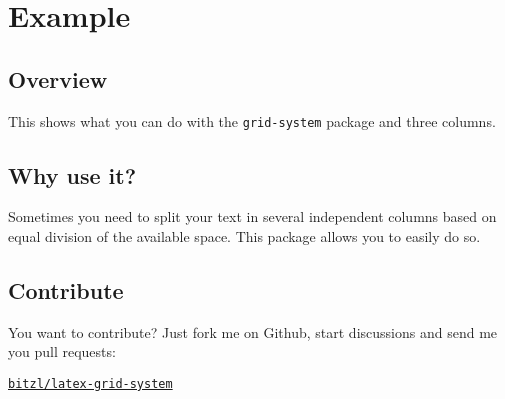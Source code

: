\documentclass[DIV13]{scrartcl}
\begin{document}
\section{Example}
\begin{row}[cellsep=0.75cm]{3}{3}
	\begin{cell}{1}
	\section*{Overview}
	\vspace{-1.5ex}
	This shows what you can do with the \texttt{grid-system} package and three columns.
	\end{cell}
	\begin{cell}{1}
	\section*{Why use it?}
	\vspace{-1.5ex}
	Sometimes you need to split your text in several independent columns based on equal division of the available space. This package allows you to easily do so.
	\end{cell}
	\begin{cell}{1}
	\section*{Contribute}
	\vspace{-1.5ex}
	You want to contribute? Just fork me on Github, start discussions and send me you pull requests: 
	\begin{center}
	\href{https://github.com/bitzl/latex-grid-system}{\tt bitzl/latex-grid-system}
	\end{center}
	\end{cell}
\end{row}

\bigskip
\end{document}
